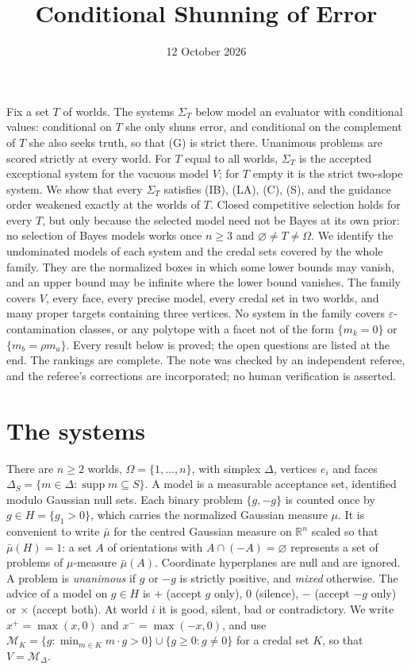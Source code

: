 \documentclass[11pt]{article}
\title{Conditional Shunning of Error}
\author{}\date{12 October 2026}
\theoremstyle{remark}\newtheorem{remark}[theorem]{Remark}
\newcommand{\M}{\mathcal M}
\newcommand{\R}{\mathbb R}
\newcommand{\supp}{\operatorname{supp}}
\begin{document}
\maketitle

\noindent
Fix a set $T$ of worlds. The systems $\Sigma_T$ below model an evaluator
with conditional values: conditional on $T$ she only shuns error, and
conditional on the complement of $T$ she also seeks truth, so that (G) is
strict there. Unanimous problems are scored strictly at every world. For
$T$ equal to all worlds, $\Sigma_T$ is the accepted exceptional system for
the vacuous model $V$; for $T$ empty it is the strict two-slope system. We show that every $\Sigma_T$
satisfies (IB), (LA), (C), (S), and the guidance order weakened exactly at
the worlds of $T$. Closed competitive selection holds for every $T$, but
only because the selected model need not be Bayes at its own prior: no
selection of Bayes models works once $n\ge3$ and $\varnothing\ne T\ne\Omega$.
We identify the undominated models of each system and the credal sets
covered by the whole family. They are the normalized boxes in which some
lower bounds may vanish, and an upper bound may be infinite where the lower
bound vanishes. The family covers $V$, every face, every precise model,
every credal set in two worlds, and many proper targets containing three
vertices. No system in the family covers $\varepsilon$-contamination
classes, or any polytope with a facet not of the form $\{m_k=0\}$ or
$\{m_b=\rho m_a\}$. Every result below is proved; the open questions are
listed at the end. The rankings are complete. The note was checked by an
independent referee, and the referee's corrections are incorporated; no
human verification is asserted.

\section{The systems}

There are $n\ge2$ worlds, $\Omega=\{1,\ldots,n\}$, with simplex $\Delta$,
vertices $e_i$ and faces $\Delta_S=\{m\in\Delta:\supp m\subseteq S\}$.
A model is a measurable acceptance set, identified modulo Gaussian null
sets. Each binary problem $\{g,-g\}$ is counted once by $g\in H=\{g_1>0\}$,
which carries the normalized Gaussian measure $\mu$. It is convenient to
write $\bar\mu$ for the centred Gaussian measure on $\R^n$ scaled so that
$\bar\mu(H)=1$: a set $A$ of orientations with $A\cap(-A)=\varnothing$
represents a set of problems of $\mu$-measure $\bar\mu(A)$. Coordinate
hyperplanes are null and are ignored. A problem is \emph{unanimous} if $g$
or $-g$ is strictly positive, and \emph{mixed} otherwise. The advice of a
model on $g\in H$ is $+$ (accept $g$ only), $0$ (silence), $-$ (accept $-g$
only) or $\times$ (accept both). At world $i$ it is good, silent, bad or
contradictory. We write $x^+=\max(x,0)$ and $x^-=\max(-x,0)$, and use
$\M_K=\{g:\min_{m\in K}m\cdot g>0\}\cup\{g\ge0:g\ne0\}$ for a credal set
$K$, so that $V=\M_\Delta$.
\end{document}
